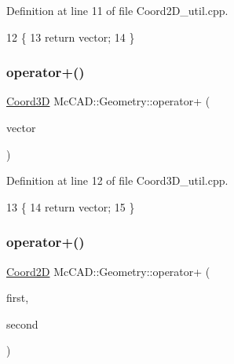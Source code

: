 Definition at line 11 of file Coord2\+D\+\_\+util.\+cpp.


\begin{DoxyCode}
12                               \{
13     \textcolor{keywordflow}{return} vector;
14 \}
\end{DoxyCode}
\mbox{\label{namespaceMcCAD_1_1Geometry_afe4b139d4360640fd7f84318b932b553}} 
\subsubsection{\texorpdfstring{operator+()}{operator+()}\hspace{0.1cm}{\footnotesize\ttfamily [3/6]}}
{\footnotesize\ttfamily \hyperlink{classMcCAD_1_1Geometry_1_1Coord3D}{Coord3D} Mc\+C\+A\+D\+::\+Geometry\+::operator+ (\begin{DoxyParamCaption}\item[{const \hyperlink{classMcCAD_1_1Geometry_1_1Coord3D}{Coord3D} \&}]{vector }\end{DoxyParamCaption})}



Definition at line 12 of file Coord3\+D\+\_\+util.\+cpp.


\begin{DoxyCode}
13                               \{
14     \textcolor{keywordflow}{return} vector;
15 \}
\end{DoxyCode}
\mbox{\label{namespaceMcCAD_1_1Geometry_a737436e759da80cfaca4cc9ab0daa44d}} 
\subsubsection{\texorpdfstring{operator+()}{operator+()}\hspace{0.1cm}{\footnotesize\ttfamily [4/6]}}
{\footnotesize\ttfamily \hyperlink{classMcCAD_1_1Geometry_1_1Coord2D}{Coord2D} Mc\+C\+A\+D\+::\+Geometry\+::operator+ (\begin{DoxyParamCaption}\item[{const \hyperlink{classMcCAD_1_1Geometry_1_1Coord2D}{Coord2D} \&}]{first,  }\item[{const \hyperlink{classMcCAD_1_1Geometry_1_1Coord2D}{Coord2D} \&}]{second }\end{DoxyParamCaption})}



